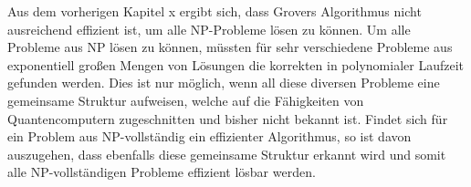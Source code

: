 Aus dem vorherigen Kapitel x ergibt sich, dass Grovers Algorithmus nicht ausreichend effizient ist, um alle NP-Probleme lösen zu können. Um alle Probleme aus NP lösen zu können, müssten für sehr verschiedene Probleme aus exponentiell großen Mengen von Lösungen die korrekten in polynomialer Laufzeit gefunden werden. Dies ist nur möglich, wenn all diese diversen Probleme eine gemeinsame Struktur aufweisen, welche auf die Fähigkeiten von Quantencomputern zugeschnitten und bisher nicht bekannt ist. Findet sich für ein Problem aus NP-vollständig ein effizienter Algorithmus, so ist davon auszugehen, dass ebenfalls diese gemeinsame Struktur erkannt wird und somit alle NP-vollständigen Probleme effizient lösbar werden.